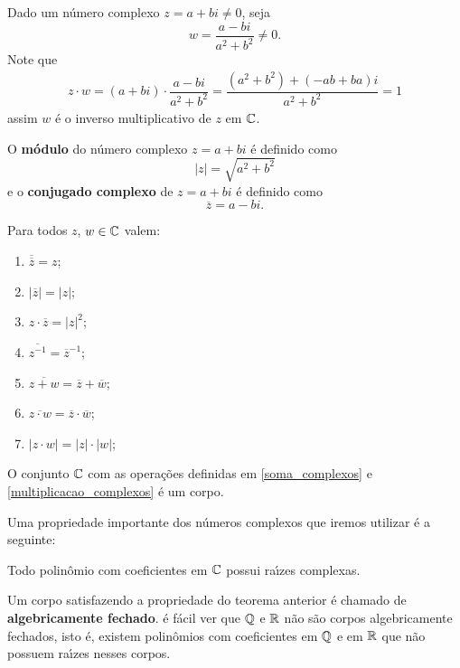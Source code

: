 Dado um número complexo $z = a + bi \ne 0$, seja
\[
	w = \dfrac{a - bi}{a^2 + b^2} \ne 0.
\]
Note que
\begin{align*}
	z\cdot w = (a + bi)\cdot \dfrac{a - bi}{a^2 + b^2} = \dfrac{(a^2 + b^2) + (-ab + ba)i}{a^2 + b^2} = 1
\end{align*}
assim $w$ é o inverso multiplicativo de $z$ em $\mathbb{C}$.

O \textbf{m\'odulo} do número complexo $z = a + bi$ é definido como
\[
	|z| = \sqrt{a^2 + b^2}
\]
e o \textbf{conjugado complexo} de $z = a + bi$ é definido como
\[
	\overline{z} = a - bi.
\]

\begin{proposicao}
	Para todos $z$, $w \in \mathbb{C}$ valem:
	\begin{enumerate}[label={\roman*})]
		\item $\overline{\overline{z}} = z$;
		\item $|\overline{z}| = |z|$;
		\item $z\cdot\overline{z} = |z|^2$;
		\item $\overline{z^{-1}} = \overline{z}^{-1}$;
		\item $\overline{z + w} = \overline{z} + \overline{w}$;
		\item $\overline{z \cdot w} = \overline{z} \cdot \overline{w}$;
		\item $|z \cdot w| = |z| \cdot |w|$;
	\end{enumerate}
\end{proposicao}

\begin{proposicao}
	O conjunto $\mathbb{C}$ com as operações definidas em \eqref{soma_complexos} e \eqref{multiplicacao_complexos} é um corpo.
\end{proposicao}

Uma propriedade importante dos números complexos que iremos utilizar é a seguinte:
\begin{teorema}
	Todo polin\^omio com coeficientes em $\mathbb{C}$ possui ra{\'\i}zes complexas.
\end{teorema}

\begin{observacao}
	Um corpo satisfazendo a propriedade do teorema anterior é chamado de \textbf{algebricamente fechado}. é fácil ver que $\mathbb{Q}$ e $\mathbb{R}$ não são corpos algebricamente fechados, isto é, existem polin\^omios com coeficientes em $\mathbb{Q}$ e em $\mathbb{R}$ que não possuem ra{\'\i}zes nesses corpos.
\end{observacao}
